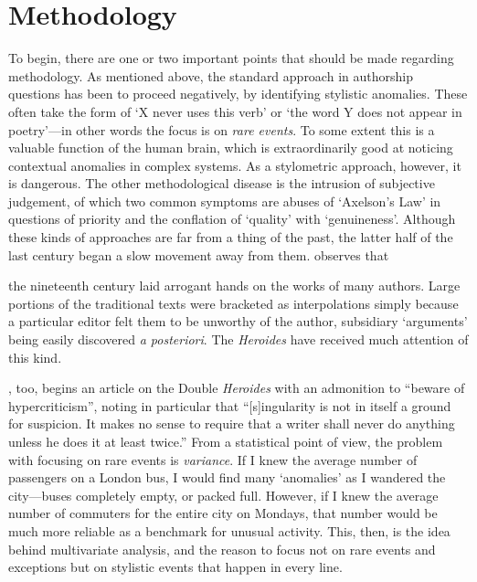 \documentclass[twocolumn, switch, a4paper]{article} %
\begin{document}
\section{Methodology}
\label{sec: methodology}

To begin, there are one or two important points that should be made regarding
methodology. As mentioned above, the standard approach in authorship questions
has been to proceed negatively, by identifying stylistic anomalies. These
often take the form of `X never uses this verb' or `the word Y does not appear
in poetry'---in other words the focus is on \emph{rare events}. To some extent
this is a valuable function of the human brain, which is extraordinarily good
at noticing contextual anomalies in complex systems. As a stylometric
approach, however, it is dangerous. The other methodological disease is the
intrusion of subjective judgement, of which two common symptoms are abuses of
`Axelson's Law' in questions of priority and the conflation of `quality' with
`genuineness'. Although these kinds of approaches are far from a thing of the
past, the latter half of the last century began a slow movement away from
them.  observes that

\begin{adjustwidth}{0.07\linewidth}{0.07\linewidth}
\footnotesize%
the nineteenth century laid arrogant hands on the works of many authors. Large
portions of the traditional texts were bracketed as interpolations simply
because a particular editor felt them to be unworthy of the author, subsidiary
`arguments' being easily discovered \emph{a posteriori}. The \emph{Heroides}
have received much attention of this kind.
\end{adjustwidth}

, too, begins an article on the Double
\emph{Heroides} with an admonition to ``beware of hypercriticism'', noting in
particular that ``[s]ingularity is not in itself a ground for suspicion. It
makes no sense to require that a writer shall never do anything unless he does
it at least twice.'' From a statistical point of view, the problem with
focusing on rare events is \emph{variance}. If I knew the average number of
passengers on a London bus, I would find many `anomalies' as I wandered the
city---buses completely empty, or packed full. However, if I knew the average
number of commuters for the entire city on Mondays, that number would be much
more reliable as a benchmark for unusual activity. This, then, is the idea
behind multivariate analysis, and the reason to focus not on rare events and
exceptions but on stylistic events that happen in every line.
\end{document}

